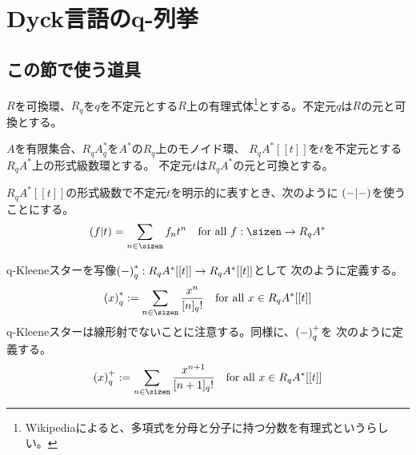 \newcommand{\Brz}{\mycal{B}}
\newcommand{\cat}[1]{\mybf{{#1}}}
\newcommand{\onto}{\myop{onto}}
\newcommand{\Maybe}{\myop{Maybe}}
\newcommand{\dabs}[1]{\left\lVert{#1}\right\rVert}
%
\newcommand{\smallxy}[1]{\vcenter{\xymatrix@R=4pt@C=4pt{#1}}}
\newcommand{\hen}{\ar@{-}}
\newcommand{\er}{\ar@{-}}
%
\newcommand{\wordu}{1_\W}
\newcommand{\treeu}{1_\T}
\newcommand{\Path}{\mycal{P}}
\newcommand{\brz}{Brzozowski}
\newcommand{\diff}{\partial}
\newcommand{\qstar}{q_*}
%
{\setlength\arraycolsep{2pt}
%
\section{Dyck言語のq-列挙}\label{s1:Dyck言語のq-列挙-バックアップ} %
\subsection{この節で使う道具}\label{s2:この節で使う道具} %
	$R$を可換環、$R_q$を$q$を不定元とする$R$上の有理式体\footnote{
		Wikipediaによると、多項式を分母と分子に持つ分数を有理式というらしい。
	}とする。不定元$q$は$R$の元と可換とする。

	$A$を有限集合、$R_qA_q^*$を$A^*$の$R_q$上のモノイド環、
	$R_qA^*[[t]]$を$t$を不定元とする$R_qA^*$上の形式級数環とする。
	不定元$t$は$R_qA^*$の元と可換とする。
	
	$R_qA^*[[t]]$の形式級数で不定元$t$を明示的に表すとき、次のように
	$\left({-|-}\right)$を使うことにする。
	\begin{equation*}\begin{split}
		\lr{f|t} = \sum_{n\in\sizen} f_nt^n
		\quad\text{for all } f:\sizen\to R_qA^*
	\end{split}\end{equation*}

	q-Kleeneスターを写像$\left({-}\right)_q^*:R_qA^*[[t]]\to R_qA^*[[t]]$として
	次のように定義する。
	\begin{equation*}\begin{split}
		\lr{x}_q^* := \sum_{n\in\sizen}\frac{x^n}{[n]_q!}
		\quad\text{for all } x\in R_qA^*[[t]]
	\end{split}\end{equation*}
	q-Kleeneスターは線形射でないことに注意する。同様に、$\left({-}\right)_q^+$を
	次のように定義する。
	\begin{equation*}\begin{split}
		\lr{x}_q^+ := \sum_{n\in\sizen}\frac{x^{n+1}}{[n+1]_q!}
		\quad\text{for all } x\in R_qA^*[[t]]
	\end{split}\end{equation*}

}
